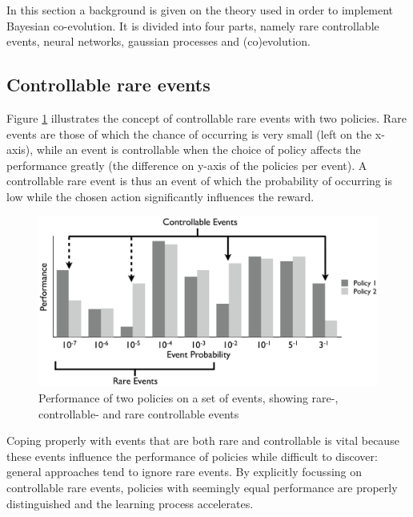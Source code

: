 In this section a background is given on the theory used in order to implement Bayesian co-evolution. It is divided into four parts, namely rare controllable events, neural networks, gaussian processes and (co)evolution. 

\subsection{Controllable rare events}
Figure \ref{rareControllableImage} illustrates the concept of controllable rare events with two policies. Rare events are those of which the chance of occurring is very small (left on the x-axis), while an event is controllable when the choice of policy affects the performance greatly (the difference on y-axis of the policies per event). A controllable rare event is thus an event of which the probability of occurring is low while the chosen action significantly influences the reward.

\begin{figure}[h]
  \centering
  \includegraphics{images/rare-controllable.png}
  \caption{Performance of two policies on a set of events, showing rare-, controllable- and rare controllable events}\label{rareControllableImage}
\end{figure}

Coping properly with events that are both rare and controllable is vital because these events influence the performance of policies while difficult to discover: general approaches tend to ignore rare events. By explicitly focussing on controllable rare events, policies with seemingly equal performance are properly distinguished and the learning process accelerates.

